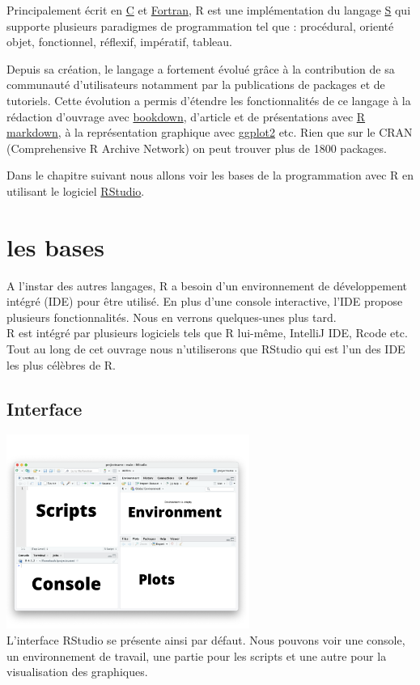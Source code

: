 \documentclass[
]{book}
\theoremstyle{definition}
\theoremstyle{definition}
\theoremstyle{definition}
\theoremstyle{definition}
\theoremstyle{remark}
\begin{document}
Principalement écrit en \href{https://en.wikipedia.org/wiki/C_(programming_language)}{C} et \href{https://en.wikipedia.org/wiki/Fortran}{Fortran}, R est une implémentation du langage \href{https://en.wikipedia.org/wiki/S_(programming_language)}{S} qui supporte plusieurs paradigmes de programmation tel que : procédural, orienté objet, fonctionnel, réflexif, impératif, tableau.

Depuis sa création, le langage a fortement évolué grâce à la contribution de sa communauté d'utilisateurs notamment par la publications de packages et de tutoriels. Cette évolution a permis d'étendre les fonctionnalités de ce langage à la rédaction d'ouvrage avec \href{https://bookdown.org/}{bookdown}, d'article et de présentations avec \href{https://rmarkdown.rstudio.com/}{R markdown}, à la représentation graphique avec \href{https://ggplot2.tidyverse.org/reference/geom_bar.html}{ggplot2} etc.
Rien que sur le CRAN (Comprehensive R Archive Network) on peut trouver plus de 1800 packages.

Dans le chapitre suivant nous allons voir les bases de la programmation avec R en utilisant le logiciel \href{https://www.rstudio.com/}{RStudio}.

\hypertarget{base}{%
\chapter{les bases}\label{base}}

A l'instar des autres langages, R a besoin d'un environnement de développement intégré (IDE) pour être utilisé. En plus d'une console interactive, l'IDE propose plusieurs fonctionnalités. Nous en verrons quelques-unes plus tard.\\
R est intégré par plusieurs logiciels tels que R lui-même, IntelliJ IDE, Rcode etc. Tout au long de cet ouvrage nous n'utiliserons que RStudio qui est l'un des IDE les plus célèbres de R.

\hypertarget{interface}{%
\section{Interface}\label{interface}}

\includegraphics[width=3.125in,height=\textheight]{Console.png}\\
L'interface RStudio se présente ainsi par défaut. Nous pouvons voir une console, un environnement de travail, une partie pour les scripts et une autre pour la visualisation des graphiques.
\end{document}
